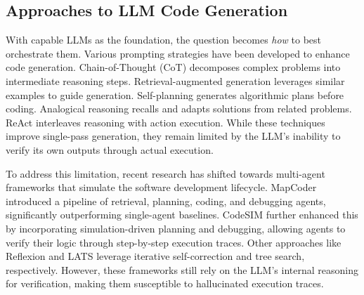 \documentclass[11pt]{article}
\begin{document}
\subsection{Approaches to LLM Code Generation}
With capable LLMs as the foundation, the question becomes \textit{how} to best orchestrate them. Various prompting strategies have been developed to enhance code generation. Chain-of-Thought (CoT) \citep{wei2022chain} decomposes complex problems into intermediate reasoning steps. Retrieval-augmented generation \citep{parvez2021retrieval} leverages similar examples to guide generation. Self-planning \citep{jiang2023self} generates algorithmic plans before coding. Analogical reasoning \citep{yasunaga2023large} recalls and adapts solutions from related problems. ReAct \citep{yao2022react} interleaves reasoning with action execution. While these techniques improve single-pass generation, they remain limited by the LLM's inability to verify its own outputs through actual execution.

To address this limitation, recent research has shifted towards multi-agent frameworks that simulate the software development lifecycle. MapCoder \citep{islam2024mapcoder} introduced a pipeline of retrieval, planning, coding, and debugging agents, significantly outperforming single-agent baselines. CodeSIM \citep{islam2025codesim} further enhanced this by incorporating simulation-driven planning and debugging, allowing agents to verify their logic through step-by-step execution traces. Other approaches like Reflexion \citep{shinn2023reflexion} and LATS \citep{zhou2023language} leverage iterative self-correction and tree search, respectively. However, these frameworks still rely on the LLM's internal reasoning for verification, making them susceptible to hallucinated execution traces.
\end{document}
